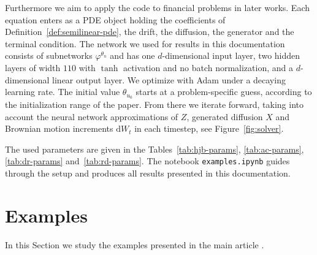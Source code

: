 ﻿\documentclass[10pt,a4paper]{article}
\begin{document}
Furthermore we aim to apply the code to financial problems in later works. Each equation enters as a PDE object holding the coefficients of Definition~\ref{def:semilinear-pde}, the drift, the diffusion, the generator and the terminal condition. The network we used for results in this documentation consists of subnetworks $\varphi^{\theta_n}$ and has one $d$-dimensional input layer, two hidden layers of width $110$ with $\tanh$ activation and no batch normalization, and a $d$-dimensional linear output layer. We optimize with Adam under a decaying learning rate. The initial value $\theta_{u_0}$ starts at a problem-specific guess, according to the initialization range of the paper. From there we iterate forward, taking into account the neural network approximations of $Z$, generated diffusion $X$ and Brownian motion increments $\mathrm dW_t$ in each timestep, see Figure~\ref{fig:solver}.

The used parameters are given in the Tables~\ref{tab:hjb-params}, \ref{tab:ac-params}, \ref{tab:dr-params} and~\ref{tab:rd-params}. The notebook \texttt{examples.ipynb} guides through the setup and produces all results presented in this documentation.

\section{Examples}
\label{sec:examples}
In this Section we study the examples presented in the main article \cite{Han2018}.
\end{document}
